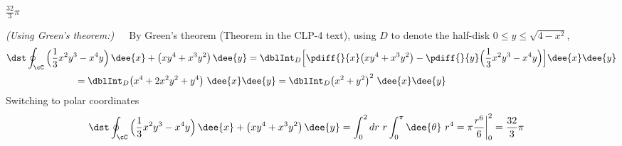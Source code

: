 \begin{answer}
$\frac{32}{3}\pi$
\end{answer}

\begin{solution}
\emph{(Using Green's theorem:)}\ \ \
By Green's theorem  (Theorem  in the CLP-4 text),
using $D$ to
denote the half-disk $0\le y\le \sqrt{4-x^2}$,
\begin{align*}
&\dst\oint_{\cC} \Big(\frac{1}{3}x^2y^3-x^4y\Big)\,\dee{x}
+\big(xy^4+x^3y^2\big)\,\dee{y}
=\dblInt_D\Big[\pdiff{}{x}\big(xy^4+x^3y^2\big)
-\pdiff{}{y}\Big(\frac{1}{3}x^2y^3-x^4y\Big) \Big] \dee{x} \dee{y}\\
&\hskip1in=\dblInt_D\big(x^4+2x^2y^2+y^4\big)\ \dee{x} \dee{y}
=\dblInt_D\big(x^2+y^2\big)^2\ \dee{x} \dee{y}
\end{align*}
Switching to polar coordinates
\begin{align*}
\dst\oint_{\cC} \Big(\frac{1}{3}x^2y^3-x^4y\Big)\,\dee{x}
+\big(xy^4+x^3y^2\big)\,\dee{y}
&=\int_0^2 dr\ r\int_0^{\pi}\dee{\theta}\ r^4
={\pi\frac{r^6}{6}\bigg|}_0^2
=\frac{32}{3}\pi
\end{align*}


\end{solution}

